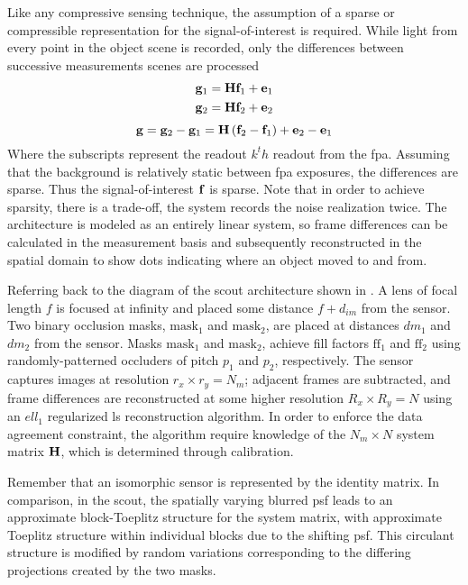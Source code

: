 Like any compressive sensing technique, the assumption of a sparse or compressible representation for the signal-of-interest is required. While light from every point in the object scene is recorded, only the differences between successive measurements scenes are processed
%
\begin{equation} 
\begin{split}
	\mathbf{g}_1 &= \mathbf{H} \mathbf{f}_1 + \mathbf{e}_1 \\
	\mathbf{g}_2 &= \mathbf{H} \mathbf{f}_2 + \mathbf{e}_2
\end{split}
\end{equation}
%
\begin{equation}
	\mathbf{g} = \mathbf{g}_2 - \mathbf{g}_1 = \mathbf{H} \left(  \mathbf{f}_2 - \mathbf{f}_1  \right) + \mathbf{e}_2 - \mathbf{e}_1
\end{equation}
%
Where the subscripts represent the readout $k^th$ readout from the \gls{fpa}. Assuming that the background is relatively static between \gls{fpa} exposures, the differences are sparse. Thus the signal-of-interest $\mathbf{f}$ is sparse. Note that in order to achieve sparsity, there is a trade-off, the system records the noise realization twice. The architecture is modeled as an entirely linear system, so frame differences can be calculated in the measurement basis and subsequently reconstructed in the spatial domain to show dots indicating where an object moved to and from.

Referring back to the diagram of the \gls{scout} architecture shown in . A lens of focal length $f$ is focused at infinity and placed some distance $f + d_{im}$ from the sensor. Two binary occlusion masks, $\text{mask}_1$ and $\text{mask}_2$, are placed at distances $dm_1$ and $dm_2$ from the sensor. Masks $\text{mask}_1$ and $\text{mask}_2$, achieve fill factors $\text{ff}_1$ and $\text{ff}_2$ using randomly-patterned occluders of pitch $p_1$ and $p_2$, respectively. The sensor captures images at resolution $ r_x \times r_y = N_m$; adjacent frames are subtracted, and frame differences are reconstructed at some higher resolution $R_x \times R_y = N$ using an $ell_1$ regularized \gls{ls} reconstruction algorithm. In order to enforce the data agreement constraint, the algorithm require knowledge of the $ N_m \times N $ system matrix $\mathbf{H}$, which is determined through calibration.

Remember that an isomorphic sensor is represented by the identity matrix. In comparison,  in the \gls{scout}, the spatially varying blurred \gls{psf} leads to an approximate block-Toeplitz structure for the system matrix, with approximate Toeplitz structure within individual blocks due to the shifting \gls{psf}. This circulant structure is modified by random variations corresponding to the differing projections created by the two masks. 

